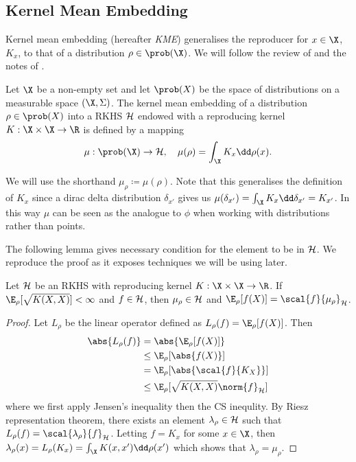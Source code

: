 \subsection{Kernel Mean Embedding} Kernel mean embedding (hereafter \emph{KME})
generalises the reproducer for \(x \in \X\), \(K_{x}\), to that of a
distribution \(\rho \in \prob(\X)\). We will follow the review of
\citep{muandet17_kernel_mean_embed_distr} and the notes of
\citep{gretton18_advan_topic_machin_learn}.

\begin{definition}
  \label{def:kernel-mean-embedding} Let \(\X\) be a non-empty set and let
\(\prob(X)\) be the space of distributions on a measurable space \((\X,
\Sigma)\). The kernel mean embedding of a distribution \(\rho \in \prob(X)\)
into a RKHS \(\mathcal{H}\) endowed with a reproducing kernel \(K: \X \times \X \to
\R\) is defined by a mapping
  \begin{equation*}
    \label{eq:kernel-mean-embedding} \mu : \prob(\X) \to \rkhs{H}, \quad
\mu(\rho) = \int_{\X} K_{x} \dd \rho(x).
  \end{equation*}
\end{definition} We will use the shorthand \(\mu_{\rho} \coloneqq \mu(\rho)\).
Note that this generalises the definition of \(K_{x}\) since a dirac delta
distribution \(\delta_{x'}\) gives us \(\mu(\delta_{x'}) = \int_{\X}K_{x} \dd
\delta_{x'} = K_{x'}\). In this way \(\mu\) can be seen as the analogue to
\(\phi\) when working with distributions rather than points.

The following lemma gives necessary condition for the element to be in
\(\mathcal{H}\). We reproduce the proof as it exposes techniques we will be using
later.

\begin{theorem} Let \(\mathcal{H}\) be an RKHS with reproducing kernel \(K: \X
\times \X \to \R\). If \(\E_{\rho}[\sqrt{K(X, X)}] < \infty\) and \(f \in
\mathcal{H}\), then \(\mu_{\rho} \in \mathcal{H}\) and \(\E_{\rho}[f(X)] =
\scal{f}{\mu_{\rho}}_{\rkhs{H}}\).
\end{theorem}

\begin{proof} Let \(L_{\rho}\) be the linear operator defined as \(L_{\rho}(f) =
\E_{\rho}[f(X)]\). Then
  \begin{align*} \abs{ L_{\rho}(f) } & = \abs{\E_{\rho}[f(X)]} \\ & \leq
\E_{\rho}[\abs{f(X)}] \\ & = \E_{\rho}[\abs{\scal{f}{K_{X}}}] \\ & \leq
\E_{\rho}[\sqrt{K(X, X)} \norm{f}_{\rkhs{H}}]
  \end{align*} where we first apply Jensen's inequality then the CS inequlity.
By Riesz representation theorem, there exists an element \(\lambda_{\rho} \in
\mathcal{H}\) such that \(L_{\rho}(f) = \scal{\lambda_{\rho}}{f}_{\rkhs{H}}\).
Letting \(f = K_{x}\) for some \(x \in \X\), then \(\lambda_{\rho}(x) =
L_{\rho}(K_{x}) = \int_{\X} K(x, x') \dd \rho(x')\) which shows that
\(\lambda_{\rho} = \mu_{\rho}\).
\end{proof}

